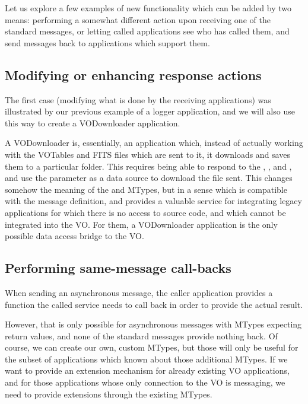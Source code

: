 		Let us explore a few examples of new functionality which
		can be added by two means: performing a somewhat different
		action upon receiving one of the standard messages, or
		letting called applications see who has called them, and
		send messages back to applications which support them.
		
		\subsection{Modifying or enhancing response actions} %
		\label{sub:modifying_or_enhancing_response_actions}
			The first case (modifying what is done by the receiving
			applications) was illustrated by our previous example of
			a logger application, and we will also use this way to
			create a VODownloader application.
			
			A VODownloader is, essentially, an application which,
			instead of actually working with the VOTables and FITS
			files which are sent to it, it downloads and saves them
			to a particular folder. This requires being able to
			respond to the ,
			, and ,
			and use the  parameter as a data source to
			download the file sent. This changes somehow the
			meaning of the  and
			 MTypes, but in a sense which
			is compatible with the message definition, and provides
			a valuable service for integrating legacy applications
			for which there is no access to source code, and which
			cannot be integrated into the VO. For them, a
			VODownloader application is the only possible data
			access bridge to the VO.
		
		\subsection{Performing same-message call-backs} %
		\label{sub:performing_arbitrary_client_callbacks}
			When sending an asynchronous message, the caller
			application provides a function the called
			service needs to call back in order to provide
			the actual result.
			
			However, that is only possible for asynchronous
			messages with MTypes expecting return values, and none
			of the standard messages provide nothing back.
			Of course, we can create our own, custom MTypes, but
			those will only be useful for the subset of applications
			which known about those additional MTypes. If we want to
			provide an extension mechanism for already existing
			VO applications, and for those applications whose only
			connection to the VO is messaging, we need to provide
			extensions through the existing MTypes.
			
